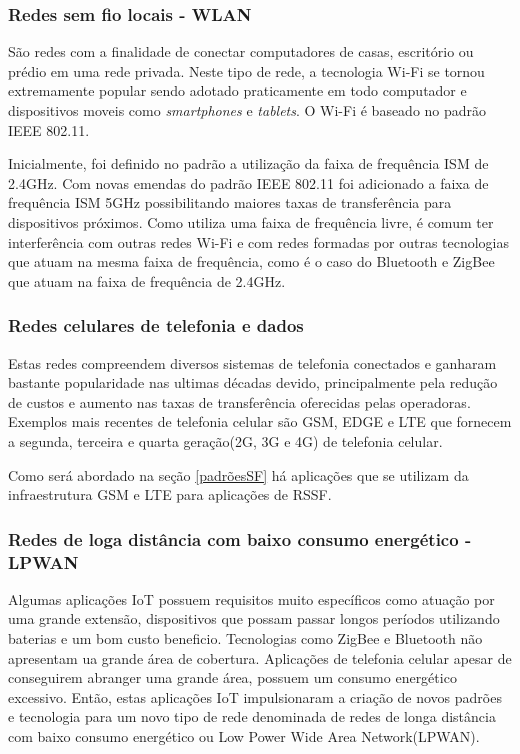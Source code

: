 \subsubsection*{Redes sem fio locais - WLAN}
São redes com a finalidade de conectar computadores de casas, escritório ou prédio em uma rede privada. Neste tipo de rede, a tecnologia Wi-Fi se tornou extremamente popular sendo adotado praticamente em todo computador e dispositivos moveis como \emph{smartphones} e \emph{tablets}. O Wi-Fi é baseado no padrão IEEE 802.11.

Inicialmente, foi definido no padrão a utilização da faixa de frequência ISM de 2.4GHz. Com novas emendas do padrão IEEE 802.11 foi adicionado a faixa de frequência ISM 5GHz possibilitando maiores taxas de transferência para dispositivos próximos. Como utiliza uma faixa de frequência livre, é comum ter interferência com outras redes Wi-Fi e com redes formadas por outras tecnologias que atuam na mesma faixa de frequência, como é o caso do Bluetooth e ZigBee que atuam na faixa de frequência de 2.4GHz.

\subsubsection*{Redes celulares de telefonia e dados}
Estas redes compreendem diversos sistemas de telefonia conectados e ganharam bastante popularidade nas ultimas décadas devido, principalmente pela redução de custos e aumento nas taxas de transferência oferecidas pelas operadoras. Exemplos mais recentes de telefonia celular são GSM, EDGE e LTE que fornecem a segunda, terceira e quarta geração(2G, 3G e 4G) de telefonia celular.

Como será abordado na seção \ref{padrõesSF} há aplicações que se utilizam da infraestrutura GSM e LTE para aplicações de RSSF.


\subsubsection*{Redes de loga distância com baixo consumo energético - LPWAN}
Algumas aplicações IoT possuem requisitos muito específicos como atuação por uma grande extensão, dispositivos que possam passar longos períodos utilizando baterias e um bom custo beneficio. Tecnologias como ZigBee e Bluetooth não apresentam ua grande área de cobertura. Aplicações de telefonia celular apesar de conseguirem abranger uma grande área, possuem um consumo energético excessivo. Então, estas aplicações IoT impulsionaram a criação de novos padrões e tecnologia para um novo tipo de rede denominada de redes de longa distância com baixo consumo energético ou Low Power Wide Area Network(LPWAN).

